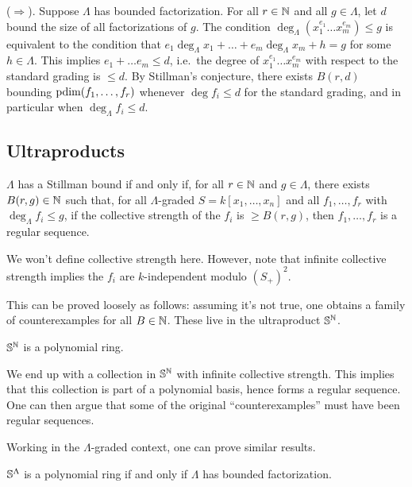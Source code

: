 \documentclass{article}
\begin{document}
($\Rightarrow$).
Suppose $\Lambda$ has bounded factorization.
For all $r \in \mathbb{N}$ and all $g \in \Lambda$, let $d$ bound the size of all factorizations of $g$.
The condition $\deg_\Lambda(x_1^{e_1} \dots x_m^{e_m}) \leq g$ is equivalent to the condition that $e_1 \deg_\Lambda x_1 + \dots + e_m \deg_\Lambda x_m + h = g$ for some $h \in \Lambda$.
This implies $e_1 + \dots e_m \leq d$, i.e.\ the degree of $x_1^{e_1} \dots x_m^{e_m}$ with respect to the standard grading is $\leq d$.
By Stillman's conjecture, there exists $B(r, d)$ bounding $\operatorname{pdim}(f_1, \dots, f_r)$ whenever $\deg f_i \leq d$ for the standard grading, and in particular when $\deg_\Lambda f_i \leq d$.

\subsection{Ultraproducts}

\begin{lem}
	$\Lambda$ has a Stillman bound if and only if, for all $r \in \mathbb{N}$ and $g \in \Lambda$, there exists $B(r, g) \in \mathbb{N}$ such that, for all $\Lambda$-graded $S = k[x_1, \dots, x_n]$ and all $f_1, \dots, f_r$ with $\deg_\Lambda f_i \leq g$, if the collective strength of the $f_i$ is $\geq B(r, g)$, then $f_1, \dots, f_r$ is a regular sequence.
\end{lem}

We won't define collective strength here.
However, note that infinite collective strength implies the $f_i$ are $k$-independent modulo $(S_+)^2$.

This can be proved loosely as follows: assuming it's not true, one obtains a family of counterexamples for all $B \in \mathbb{N}$.
These live in the ultraproduct $\mathbb{S}^{\mathbb{N}}$.

\begin{thm}
	$\mathbb{S}^{\mathbb{N}}$ is a polynomial ring.
\end{thm}

We end up with a collection in $\mathbb{S}^{\mathbb{N}}$ with infinite collective strength.
This implies that this collection is part of a polynomial basis, hence forms a regular sequence.
One can then argue that some of the original ``counterexamples'' must have been regular sequences.

Working in the $\Lambda$-graded context, one can prove similar results.

\begin{thm}
	$\mathbb{S}^\Lambda$ is a polynomial ring if and only if $\Lambda$ has bounded factorization.
\end{thm}
\end{document}
